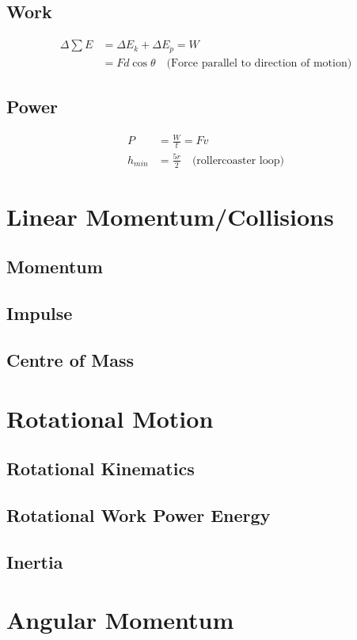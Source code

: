 \documentclass[letterpaper,10pt]{article}
\begin{document}
\begin{multicols}{2}
\subsection{Work}
\begin{align*}
    \Delta \sum E &= \Delta E_k + \Delta E_p = W \\
    &= F d \cos \theta \quad \textrm{(Force parallel to direction of motion)}
\end{align*}

\subsection{Power}
\begin{align*}
    P &= \frac{W}{t} = Fv \\
    h_{min} &= \frac{5r}{2} \quad \textrm{(rollercoaster loop)}
\end{align*}

\section{Linear Momentum/Collisions}
\subsection{Momentum}
\subsection{Impulse}
\subsection{Centre of Mass}

\section{Rotational Motion}
\subsection{Rotational Kinematics}
\subsection{Rotational Work Power Energy}
\subsection{Inertia}

\section{Angular Momentum}

\end{multicols}
\end{document}
